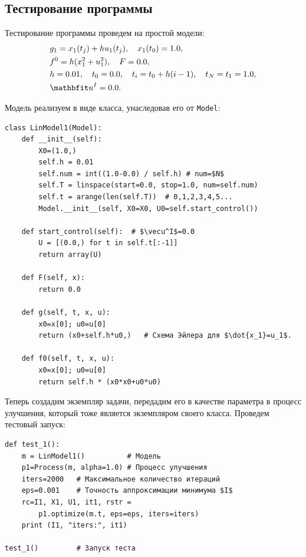 \documentclass[a4paper,14pt, openany, twoside, final]{extbook} %
\begin{document}
\subsection{Тестирование программы}
\label{sec:testing}

Тестирование программы проведем на простой модели:
\begin{align*}
  &g_1=x_1(t_j)+hu_1(t_j),\quad x_1(t_0)=1.0,\\
  &f^0=h(x_1^2+u_1^2),\quad F=0.0, \\
  &h=0.01,\quad t_0=0.0, \quad t_i=t_0+h(i-1),\quad t_N=t_1=1.0,\\
  &\vecu^I=0.0.
\end{align*}

Модель реализуем в виде класса, унаследовав его от \texttt{Model}:\enlargethispage{-3em}
\begin{verbatim}
class LinModel1(Model):
    def __init__(self):
        X0=(1.0,)
        self.h = 0.01
        self.num = int((1.0-0.0) / self.h) # num=$N$
        self.T = linspace(start=0.0, stop=1.0, num=self.num)
        self.t = arange(len(self.T))  # 0,1,2,3,4,5...
        Model.__init__(self, X0=X0, U0=self.start_control())

    def start_control(self):  # $\vecu^I$=0.0
        U = [(0.0,) for t in self.t[:-1]]
        return array(U)

    def F(self, x):
        return 0.0

    def g(self, t, x, u):
        x0=x[0]; u0=u[0]
        return (x0+self.h*u0,)   # Схема Эйлера для $\dot{x_1}=u_1$.

    def f0(self, t, x, u):
        x0=x[0]; u0=u[0]
        return self.h * (x0*x0+u0*u0)
\end{verbatim}

Теперь создадим экземпляр задачи, передадим его в качестве параметра в процесс улучшения, который тоже является экземпляром своего класса.  Проведем тестовый запуск:

\begin{verbatim}
def test_1():
    m = LinModel1()          # Модель
    p1=Process(m, alpha=1.0) # Процесс улучшения
    iters=2000   # Максимальное количество итераций
    eps=0.001    # Точность аппроксимации минимума $I$
    rc=I1, X1, U1, it1, rstr =
        p1.optimize(m.t, eps=eps, iters=iters)
    print (I1, "iters:", it1)

test_1()         # Запуск теста
\end{verbatim}
\end{document}
